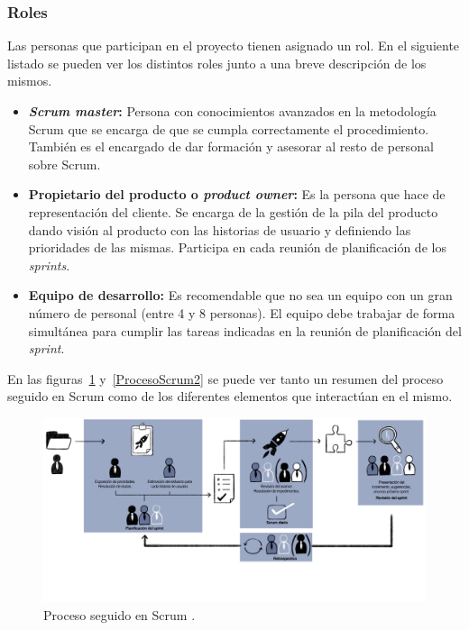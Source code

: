 \subsubsection{Roles}
Las personas que participan en el proyecto tienen asignado un rol. En el siguiente listado se pueden ver los distintos roles junto a una breve descripción de los mismos.
\begin{itemize}
\item \textbf{\textit{Scrum master}:}
Persona con conocimientos avanzados en la metodología Scrum que se encarga de que se cumpla correctamente el procedimiento. También es el encargado de dar formación y asesorar al resto de personal sobre Scrum.

\item \textbf{Propietario del producto o \textit{product owner}:}
Es la persona que hace de representación del cliente. Se encarga de la gestión de la pila del producto dando visión al producto con las historias de usuario y definiendo las prioridades de las mismas. Participa en cada reunión de planificación de los \textit{sprints}.

\item \textbf{Equipo de desarrollo:}
Es recomendable que no sea un equipo con un gran número de personal (entre 4 y 8 personas). El equipo debe trabajar de forma simultánea para cumplir las tareas indicadas en la reunión de planificación del \textit{sprint}.
\end{itemize}

En las figuras~\ref{ProcesoScrum1} y~\ref{ProcesoScrum2} se puede ver tanto un resumen del proceso seguido en Scrum como de los diferentes elementos que interactúan en el mismo.

\begin{figure}
	\centering
	\includegraphics[width=\textwidth]{../img/Scrum/Scrum.png}
	\caption{Proceso seguido en Scrum \cite{scrum}.}\label{ProcesoScrum1}
\end{figure}


